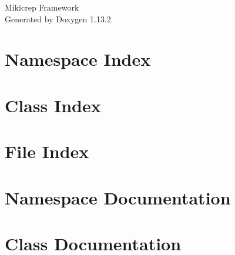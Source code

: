 \documentclass[twoside]{book}
\newcommand{\+}{\discretionary{\mbox{\scriptsize$\hookleftarrow$}}{}{}}
\newcommand{\clearemptydoublepage}{%
    \newpage{\pagestyle{empty}\cleardoublepage}%
  }
\begin{document}
  \raggedbottom
    \hypersetup{pageanchor=false,
                bookmarksnumbered=true,
                pdfencoding=unicode
               }
  \begin{titlepage}
  \vspace*{7cm}
  \begin{center}%
  {\Large Mikicrep Framework}\\
  \vspace*{1cm}
  {\large Generated by Doxygen 1.13.2}\\
  \end{center}
  \end{titlepage}
  \clearemptydoublepage
  \tableofcontents
  \clearemptydoublepage
  \hypersetup{pageanchor=true}
\chapter{Namespace Index}

\chapter{Class Index}

\chapter{File Index}

\chapter{Namespace Documentation}









\chapter{Class Documentation}















\end{document}
